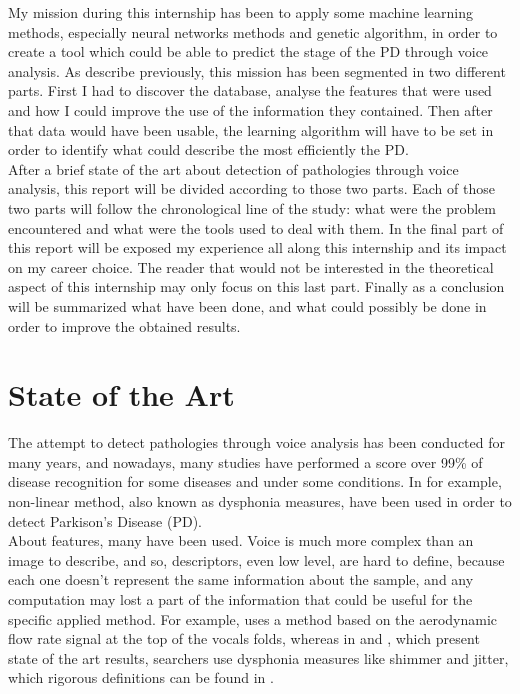 \documentclass{report}
\begin{document}
	My mission during this internship has been to apply some machine learning methods, especially neural networks methods and genetic algorithm, in order to create a tool which could be able to predict the stage of the PD through voice analysis. As describe previously, this mission has been segmented in two different parts. First I had to discover the database, analyse the features that were used and how I could improve the use of the information they contained. Then after that data would have been usable, the learning algorithm will have to be set in order to identify what could describe the most efficiently the PD.\\
	
	After a brief state of the art about detection of pathologies through voice analysis, this report will be divided according to those two parts. Each of those two parts will follow the chronological line of the study: what were the problem encountered and what were the tools used to deal with them. In the final part of this report will be exposed my experience all along this internship and its impact on my career choice. The reader that would not be interested in the theoretical aspect of this internship may only focus on this last part. Finally as a conclusion will be summarized what have been done, and what could possibly be done in order to improve the obtained results.\\
	
	\chapter{State of the Art}
	
	The attempt to detect pathologies through voice analysis has been conducted for many years, and nowadays, many studies have performed a score over 99\% of disease recognition for some diseases and under some conditions. In \cite{little2006nonlinear} for example, non-linear method, also known as dysphonia measures, have been used in order to detect Parkison's Disease (PD).\\
	
	About features, many have been used. Voice is much more complex than an image to describe, and so, descriptors, even low level, are hard to define, because each one doesn't represent the same information about the sample, and any computation may lost a part of the information that could be useful for the specific applied method. For example, \cite{little2006nonlinear} uses a method based on the aerodynamic flow rate signal at the top of the vocals folds, whereas in \cite{tsanas2012novel} and \cite{tsanas2012using}, which present state of the art results, searchers use dysphonia measures like shimmer and jitter, which rigorous definitions can be found in \cite{tsanas2011nonlinear}.\\
	
\end{document}
